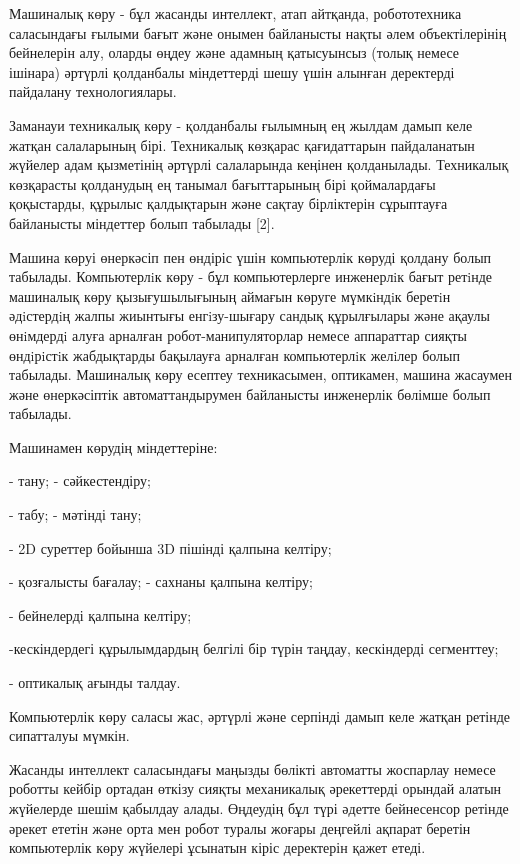 Машиналық көру - бұл жасанды интеллект, атап айтқанда, робототехника
саласындағы ғылыми бағыт және онымен байланысты нақты әлем
объектілерінің бейнелерін алу, оларды өңдеу және адамның қатысуынсыз
(толық немесе ішінара) әртүрлі қолданбалы міндеттерді шешу үшін алынған
деректерді пайдалану технологиялары.

Заманауи техникалық көру - қолданбалы ғылымның ең жылдам дамып келе
жатқан салаларының бірі. Техникалық көзқарас қағидаттарын пайдаланатын
жүйелер адам қызметінің әртүрлі салаларында кеңінен қолданылады.
Техникалық көзқарасты қолданудың ең танымал бағыттарының бірі
қоймалардағы қоқыстарды, құрылыс қалдықтарын және сақтау бірліктерін
сұрыптауға байланысты міндеттер болып табылады {[}2{]}.

Машина көруі өнеркәсіп пен өндіріс үшін компьютерлік көруді қолдану
болып табылады. Компьютерлiк көру - бұл компьютерлерге инженерлiк бағыт
ретiнде машиналық көру қызығушылығының аймағын көруге мүмкiндiк беретiн
әдiстердiң жалпы жиынтығы енгiзу-шығару сандық құрылғылары және ақаулы
өнiмдердi алуға арналған робот-манипуляторлар немесе аппараттар сияқты
өндiрiстiк жабдықтарды бақылауға арналған компьютерлiк желiлер болып
табылады. Машиналық көру есептеу техникасымен, оптикамен, машина
жасаумен және өнеркәсіптік автоматтандырумен байланысты инженерлік
бөлімше болып табылады.

Машинамен көрудің міндеттеріне:

- тану; - сәйкестендіру;

- табу; - мәтінді тану;

- 2D суреттер бойынша 3D пішінді қалпына келтіру;

- қозғалысты бағалау; - сахнаны қалпына келтіру;

- бейнелерді қалпына келтіру;

-кескіндердегі құрылымдардың белгілі бір түрін таңдау, кескіндерді
сегменттеу;

- оптикалық ағынды талдау.

Компьютерлік көру саласы жас, әртүрлі және серпінді дамып келе жатқан
ретінде сипатталуы мүмкін.

Жасанды интеллект саласындағы маңызды бөлікті автоматты жоспарлау немесе
роботты кейбір ортадан өткізу сияқты механикалық әрекеттерді орындай
алатын жүйелерде шешім қабылдау алады. Өңдеудің бұл түрі әдетте
бейнесенсор ретінде әрекет ететін және орта мен робот туралы жоғары
деңгейлі ақпарат беретін компьютерлік көру жүйелері ұсынатын кіріс
деректерін қажет етеді.

